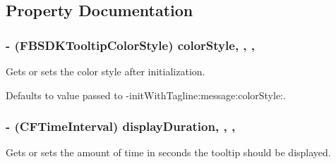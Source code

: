 \subsection{Property Documentation}
\hypertarget{interface_f_b_s_d_k_tooltip_view_a0c9571339fcc84d808716d3911d504fc}{
\subsubsection[{color\-Style}]{\setlength{\rightskip}{0pt plus 5cm}-\/ (F\-B\-S\-D\-K\-Tooltip\-Color\-Style) color\-Style\hspace{0.3cm}{\ttfamily [read]}, {\ttfamily [write]}, {\ttfamily [nonatomic]}, {\ttfamily [assign]}}}\label{interface_f_b_s_d_k_tooltip_view_a0c9571339fcc84d808716d3911d504fc}
Gets or sets the color style after initialization.

Defaults to value passed to -\/init\-With\-Tagline\-:message\-:color\-Style\-:. \hypertarget{interface_f_b_s_d_k_tooltip_view_ac94d81890eb496c7afc56277586f938f}{
\subsubsection[{display\-Duration}]{\setlength{\rightskip}{0pt plus 5cm}-\/ (C\-F\-Time\-Interval) display\-Duration\hspace{0.3cm}{\ttfamily [read]}, {\ttfamily [write]}, {\ttfamily [nonatomic]}, {\ttfamily [assign]}}}\label{interface_f_b_s_d_k_tooltip_view_ac94d81890eb496c7afc56277586f938f}
Gets or sets the amount of time in seconds the tooltip should be displayed.

